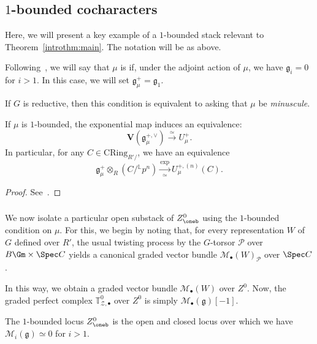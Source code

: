 \documentclass[10pt]{amsart}
\begin{document}
\subsection{$1$-bounded cocharacters}
\label{subsec:1-bounded_case}
Here, we will present a key example of a $1$-bounded stack relevant to Theorem~\ref{introthm:main}. The notation will be as above.

\begin{definition}
Following~\cite{MR4355476}, we will say that $\mu$ is  if, under the adjoint action of $\mu$, we have $\mathfrak{g}_i = 0$ for $i>1$. In this case, we will set $\mathfrak{g}^+_\mu = \mathfrak{g}_{1}$. 

If $G$ is reductive, then this condition is equivalent to asking that $\mu$ be \emph{minuscule}.
\end{definition}


\begin{lemma}
\label{lem:1-bounded_exp}
If $\mu$ is $1$-bounded, the exponential map induces an equivalence:
\[
\mathbf{V}(\mathfrak{g}^{+,\vee}_\mu)\xrightarrow{\simeq}U^{+}_\mu.
\]
In particular, for any $C\in \mathrm{CRing}_{R'/}$, we have an equivalence
\[
\mathfrak{g}^+_\mu\otimes_{R}(C/{}^{\mathbb{L}}p^n)\xrightarrow[\simeq]{\exp}U^{+,(n)}_\mu(C).
\]
\end{lemma}
\begin{proof}
See~\cite[Lemma 6.3.2]{MR4355476}.
\end{proof}




\subsubsection{}
We now isolate a particular open substack of $Z^0_{\oneb}$ using the $1$-bounded condition on $\mu$. For this, we begin by noting that, for every representation $W$ of $G$ defined over $R'$, the usual twisting process by the $G$-torsor $\mathcal{P}$ over $B\Gm\times \Spec C$ yields a canonical graded vector bundle $\mathcal{M}_\bullet(W)_{\mathcal{P}}$ over $\Spec C$. 

In this way, we obtain a graded vector bundle $\mathcal{M}_\bullet(W)$ over $Z^0$. Now, the graded perfect complex $\mathbb{T}^0_{\mathcal{Z},\bullet}$ over $Z^0$ is simply $\mathcal{M}_\bullet(\mathfrak{g})[-1]$. 

The $1$-bounded locus $Z^0_{\oneb}$ is the open and closed locus over which we have $\mathcal{M}_i(\mathfrak{g})\simeq 0$ for $i>1$.
\end{document}
